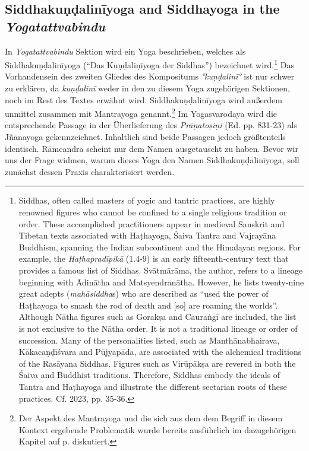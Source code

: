 \subsection{Siddhakuṇḍalinīyoga and Siddhayoga in the \textit{Yogatattvabindu}} 

In \textit{Yogatattvabindu} Sektion  wird ein Yoga beschrieben, welches als Siddhakuṇḍalinīyoga (``Das Kuṇḍaliṇīyoga der Siddhas'') bezeichnet wird.\footnote{Siddhas, often called masters of yogic and tantric practices, are highly renowned figures who cannot be confined to a single religious tradition or order. These accomplished practitioners appear in medieval Sanskrit and Tibetan texts associated with Haṭhayoga, Śaiva Tantra and Vajrayāna Buddhism, spanning the Indian subcontinent and the Himalayan regions. For example, the \emph{Haṭhapradīpikā} (1.4-9) is an early fifteenth-century text that provides a famous list of Siddhas. Svātmārāma, the author, refers to a lineage beginning with Ādinātha and Matsyendranātha. However, he lists twenty-nine great adepts (\textit{mahāsiddha}s) who are described as ``used the power of Haṭhayoga to smash the rod of death and [so] are roaming the worlds''. Although Nātha figures such as Gorakṣa and Cauraṅgī are included, the list is not exclusive to the Nātha order. It is not a traditional lineage or order of succession. Many of the personalities listed, such as Manthānabhairava, Kākacaṇḍīśvara and Pūjyapāda, are associated with the alchemical traditions of the Rasāyana Siddhas. Figures such as Virūpākṣa are revered in both the Śaiva and Buddhist traditions. Therefore, Siddhas embody the ideals of Tantra and Haṭhayoga and illustrate the different sectarian roots of these practices. Cf. \citeauthor{powell2023} 2023, pp. 35-36.} Das Vorhandensein des zweiten Gliedes des Kompositums \textit{°kuṇḍalinī°} ist nur schwer zu erklären, da \textit{kuṇḍalinī} weder in den zu diesem Yoga zugehörigen Sektionen, noch im Rest des Textes erwähnt wird. Siddhakuṇḍalinīyoga wird außerdem unmittel zusammen mit Mantrayoga genannt.\footnote{Der Aspekt des Mantrayoga und die sich aus dem dem Begriff in diesem Kontext ergebende Problematik wurde bereits ausführlich im dazugehörigen Kapitel auf p.\pageref{bindumantra} diskutiert.} Im Yogasvarodaya wird die entsprechende Passage in der Überlieferung des \textit{Prāṇatoṣiṇī} (Ed. pp. 831-23) als Jñānayoga gekennzeichnet. Inhaltlich sind beide Passagen jedoch größtenteils identisch. Rāmcandra scheint nur dem Namen ausgetauscht zu haben. Bevor wir uns der Frage widmen, warum dieses Yoga den Namen Siddhakuṇḍalinīyoga, soll zunächst dessen Praxis charakterisiert werden. 

